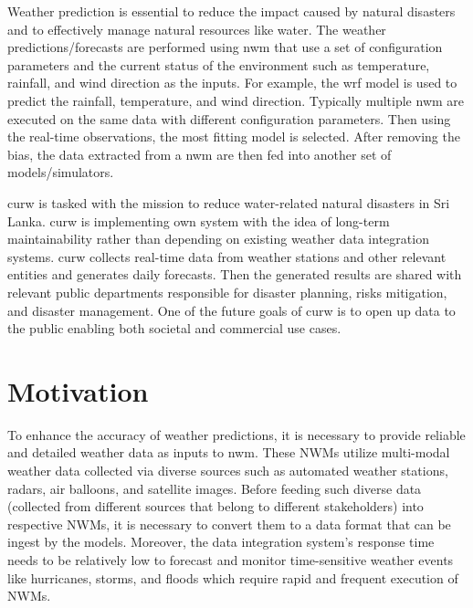 Weather prediction is essential to reduce the impact caused by natural disasters and to effectively manage natural resources like water. 
The weather predictions/forecasts are performed using \acrfull{nwm} that use a set of configuration parameters and the current status of the environment such as temperature, rainfall, and wind direction as the inputs. For example, the \acrfull{wrf} \cite{MesoscaleMicroscaleMeteorologyLaboratoryWeatherModel} model is used to predict the rainfall, temperature, and wind direction. Typically multiple \acrshort{nwm} are executed on the same data with different configuration parameters. Then using the real-time observations, the most fitting model is selected. After removing the bias, the data extracted from a \acrshort{nwm} are then fed into another set of models/simulators. 

\acrfull{curw} \cite{CUrWSL2017SL} is tasked with the mission to reduce water-related natural disasters in Sri Lanka. \acrshort{curw} \cite{CUrWSLObservedSL} is implementing own system with the idea of long-term maintainability rather than depending on existing weather data integration systems. \acrshort{curw} collects real-time data from weather stations and other relevant entities and generates daily forecasts. Then the generated results are shared with relevant public departments responsible for disaster planning, risks mitigation, and disaster management. One of the future goals of \acrshort{curw} is to open up data to the public enabling both societal and commercial use cases.


\section{Motivation}
To enhance the accuracy of weather predictions, it is necessary to provide reliable and detailed weather data as inputs to \acrshort{nwm}. These NWMs utilize multi-modal weather data collected via diverse sources such as automated weather stations, radars, air balloons, and satellite images. Before feeding such diverse data (collected from different sources that belong to different stakeholders) into respective NWMs, it is necessary to convert them to a data format that can be ingest by the models. Moreover, the data integration system's response time needs to be relatively low to forecast and monitor time-sensitive weather events like hurricanes, storms, and floods which require rapid and frequent execution of NWMs.

